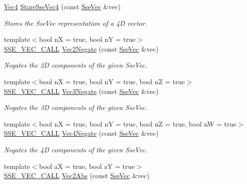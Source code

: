 \begin{DoxyCompactItemize}
\hyperlink{classgofxmath_1_1_vec4}{Vec4} \hyperlink{group___s_i_m_d_vec_math_ga451a176ebe90e4e965ee7e9def06b240}{Store\+Sse\+Vec4} (const \hyperlink{namespacegofxmath_a634570ddcd2496053ee966227080e02f}{Sse\+Vec} \&vec)
\begin{DoxyCompactList}\small\item\em Stores the Sse\+Vec representation of a 4\+D vector. \end{DoxyCompactList}\item 
{\footnotesize template$<$bool n\+X = true, bool n\+Y = true$>$ }\\\hyperlink{ssevec__math__defs_8h_a97454f977a5281455cecacce1e8ba670}{S\+S\+E\+\_\+\+V\+E\+C\+\_\+\+C\+A\+L\+L} \hyperlink{group___s_i_m_d_vec_math_gaba273219fc8b8a373abad0e833505511}{Vec2\+Negate} (const \hyperlink{namespacegofxmath_a634570ddcd2496053ee966227080e02f}{Sse\+Vec} \&vec)
\begin{DoxyCompactList}\small\item\em Negates the 2\+D components of the given Sse\+Vec. \end{DoxyCompactList}\item 
{\footnotesize template$<$bool n\+X = true, bool n\+Y = true, bool n\+Z = true$>$ }\\\hyperlink{ssevec__math__defs_8h_a97454f977a5281455cecacce1e8ba670}{S\+S\+E\+\_\+\+V\+E\+C\+\_\+\+C\+A\+L\+L} \hyperlink{group___s_i_m_d_vec_math_gad5ea03b6d75bf8e3d39a0434b4616b9c}{Vec3\+Negate} (const \hyperlink{namespacegofxmath_a634570ddcd2496053ee966227080e02f}{Sse\+Vec} \&vec)
\begin{DoxyCompactList}\small\item\em Negates the 3\+D components of the given Sse\+Vec. \end{DoxyCompactList}\item 
{\footnotesize template$<$bool n\+X = true, bool n\+Y = true, bool n\+Z = true, bool n\+W = true$>$ }\\\hyperlink{ssevec__math__defs_8h_a97454f977a5281455cecacce1e8ba670}{S\+S\+E\+\_\+\+V\+E\+C\+\_\+\+C\+A\+L\+L} \hyperlink{group___s_i_m_d_vec_math_ga4f827fad311b93fa33bd61894aeec1cc}{Vec4\+Negate} (const \hyperlink{namespacegofxmath_a634570ddcd2496053ee966227080e02f}{Sse\+Vec} \&vec)
\begin{DoxyCompactList}\small\item\em Negates the 4\+D components of the given Sse\+Vec. \end{DoxyCompactList}\item 
{\footnotesize template$<$bool a\+X = true, bool a\+Y = true$>$ }\\\hyperlink{ssevec__math__defs_8h_a97454f977a5281455cecacce1e8ba670}{S\+S\+E\+\_\+\+V\+E\+C\+\_\+\+C\+A\+L\+L} \hyperlink{group___s_i_m_d_vec_math_gae52a21e900378c201bcd250b3955d44f}{Vec2\+Abs} (const \hyperlink{namespacegofxmath_a634570ddcd2496053ee966227080e02f}{Sse\+Vec} \&vec)

\end{DoxyCompactItemize}

